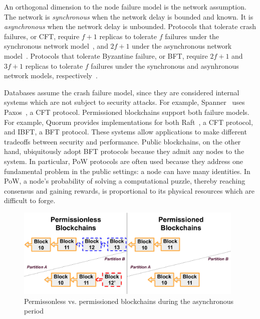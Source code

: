 An orthogonal dimension to the node failure model is the network assumption. The
network is {\em synchronous} when the network delay is bounded and known. It is
{\em asynchronous} when the network delay is unbounded. Protocols that tolerate
crash failures, or CFT, require $f+1$ replicas to tolerate $f$ failures under
the synchronous network model~\cite{budhiraja1993primary}, and $2f+1$ under the
asynchronous network model~\cite{raft,lamport2001paxos}. Protocols that tolerate
Byzantine failure, or BFT, require $2f+1$ and $3f+1$ replicas to tolerate $f$
failures under the synchronous and asynhronous network models,
respectively~\cite{castro1999practical, yin2019hotstuff,buchman2016tendermint}.

Databases assume the crash failure model, since they are considered internal
systems which are not subject to security attacks. For example,
Spanner~\cite{web:spanner} uses Paxos~\cite{lamport2005generalized}, a CFT
protocol.  Permissioned blockchains support both failure models. For example,
Quorum provides implementations for both Raft~\cite{raft}, a CFT protocol, and
IBFT, a BFT protocol. These systems allow applications to make different
tradeoffs between security and performance.
Public blockchains, on the other hand, ubiquitously adopt BFT protocols because they admit
any nodes to the system. In particular, PoW protocols are often used because
they address one fundamental problem in the public settings: a node can have
many identities. In PoW, a node's probability of solving a computational puzzle,
thereby reaching consensus and gaining rewards, is proportional to its physical
resources which are difficult to forge.

\begin{figure}
    \centering
    \includegraphics[width=0.975\textwidth]{diagram/twin/fork.pdf}
	\caption{Permissonless vs. permissioned blockchains during the asynchronous period} 
    \label{diagram:twin:fork}
\end{figure}


